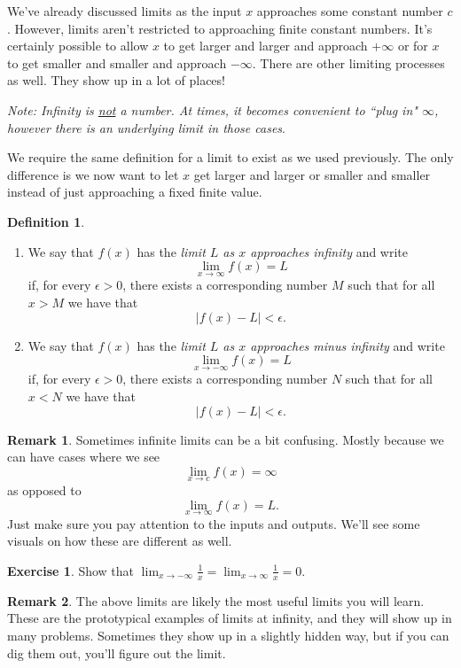 \documentclass[leqno]{article}
\theoremstyle{definition}
\newtheorem{definition}{Definition}[section]
\newtheorem{remark}{Remark}[section]
\newtheorem{exercise}{Exercise}[section]
\theoremstyle{remark}
\theoremstyle{theorem}
\begin{document}
We've already discussed limits as the input $x$ approaches some constant number $c$.  However, limits aren't restricted to approaching finite constant numbers.  It's certainly possible to allow $x$ to get larger and larger and approach $+\infty$ or for $x$ to get smaller and smaller and approach $-\infty$.  There are other limiting processes as well.  They show up in a lot of places!

\emph{Note: Infinity is \underline{not} a number.  At times, it becomes convenient to ``plug in" $\infty$, however there is an underlying limit in those cases}.

We require the same definition for a limit to exist as we used previously. The only difference is we now want to let $x$ get larger and larger or smaller and smaller instead of just approaching a fixed finite value.

\begin{definition}
\begin{enumerate}[1.]
\item We say that $f(x)$ has the \emph{limit $L$ as $x$ approaches infinity} and write
\[
\lim_{x\to \infty} f(x) = L
\]
if, for every $\epsilon>0$, there exists a corresponding number $M$ such that for all $x>M$ we have that
\[
|f(x)-L|<\epsilon.
\]
\item We say that $f(x)$ has the \emph{limit $L$ as $x$ approaches minus infinity} and write
\[
\lim_{x\to -\infty} f(x) =L
\]
if, for every $\epsilon>0$, there exists a corresponding number $N$ such that for all $x<N$ we have that
\[
|f(x)-L|<\epsilon.
\]
\end{enumerate}
\end{definition}

\begin{remark}
Sometimes infinite limits can be a bit confusing.  Mostly because we can have cases where we see
\[
\lim_{x\to c} f(x) = \infty
\]
as opposed to 
\[
\lim_{x\to \infty} f(x)= L.
\]
Just make sure you pay attention to the inputs and outputs.  We'll see some visuals on how these are different as well.
\end{remark}


\begin{exercise}
Show that $\lim_{x\to -\infty} \frac{1}{x}=\lim_{x\to \infty} \frac{1}{x}=0$. 
\vspace*{6cm}
\end{exercise}

\begin{remark}
The above limits are likely the most useful limits you will learn.  These are the prototypical examples of limits at infinity, and they will show up in many problems.  Sometimes they show up in a slightly hidden way, but if you can dig them out, you'll figure out the limit.
\end{remark}
\end{document}
